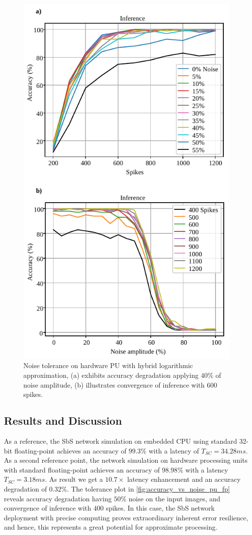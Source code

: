 \begin{figure}[b!]
	\centering
	\includegraphics[width=0.5\columnwidth]{./chapters/sbs_accelerator/figures/accuracy_vs_noise_pu_log.pdf}
	\caption{Noise tolerance on hardware PU with hybrid logarithmic approximation, (a) exhibits accuracy degradation applying $40\%$ of noise amplitude, (b) illustrates convergence of inference with $600$ spikes.}
	\label{fig:accuracy_vs_noise_pu_log}
\end{figure}


\subsection{Results and Discussion}
As a reference, the SbS network simulation on embedded CPU using standard 32-bit floating-point achieves an accuracy of $99.3\%$ with a latency of $T_{SC} = 34.28ms$. As a second reference point, the network simulation on hardware processing units with standard floating-point achieves an accuracy of $98.98\%$ with a latency $T_{SC}=3.18ms$. As result we get a $10.7\times$ latency enhancement and an accuracy degradation of $0.32\%$. The tolerance plot in \ref{fig:accuracy_vs_noise_pu_fp} reveals accuracy degradation having $50\%$ noise on the input images, and convergence of inference with $400$ spikes. In this case, the SbS network deployment with precise computing proves extraordinary inherent error resilience, and hence, this represents a great potential for approximate processing.

